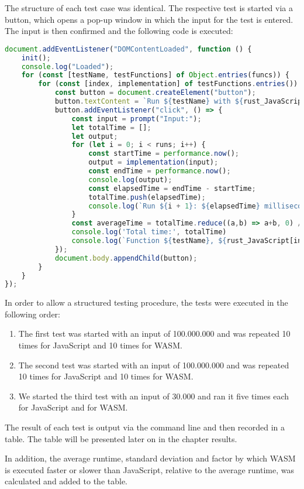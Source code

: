 The structure of each test case was identical. The respective test is started via a button, which opens a pop-up window in which the input for the test is entered. The input is then confirmed and the following code is executed:
\begin{lstlisting}[language=JavaScript, caption={Test execution, source: self-coded}]
document.addEventListener("DOMContentLoaded", function () {
    init();
    console.log("Loaded");
    for (const [testName, testFunctions] of Object.entries(funcs)) {
        for (const [index, implementation] of testFunctions.entries()) {
            const button = document.createElement("button");
            button.textContent = `Run ${testName} with ${rust_JavaScript[index]}`;
            button.addEventListener("click", () => {
                const input = prompt("Input:");
                let totalTime = [];
                let output;
                for (let i = 0; i < runs; i++) {
                    const startTime = performance.now();
                    output = implementation(input);
                    const endTime = performance.now();
                    console.log(output);
                    const elapsedTime = endTime - startTime;
                    totalTime.push(elapsedTime);
                    console.log(`Run ${i + 1}: ${elapsedTime} milliseconds`);
                }
                const averageTime = totalTime.reduce((a,b) => a+b, 0) / runs;
                console.log('Total time:', totalTime)
                console.log(`Function ${testName}, ${rust_JavaScript[index]} with input ${input} took ${averageTime} miliseconds to execute`);
            });
            document.body.appendChild(button);
        }
    }
});
\end{lstlisting}

In order to allow a structured testing procedure, the tests were executed in the following order:
\begin{enumerate}
\item The first test was started with an input of 100.000.000 and was repeated 10 times for JavaScript and 10 times for WASM.
\item The second test was started with an input of 100.000.000 and was repeated 10 times for JavaScript and 10 times for WASM.
\item We started the third test with an input of 30.000 and ran it five times each for JavaScript and for WASM.
\end{enumerate}
The result of each test is output via the command line and then recorded in a table. The table will be presented later on in the chapter results.

In addition, the average runtime, standard deviation and factor by which WASM is executed faster or slower than JavaScript, relative to the average runtime, was calculated and added to the table.